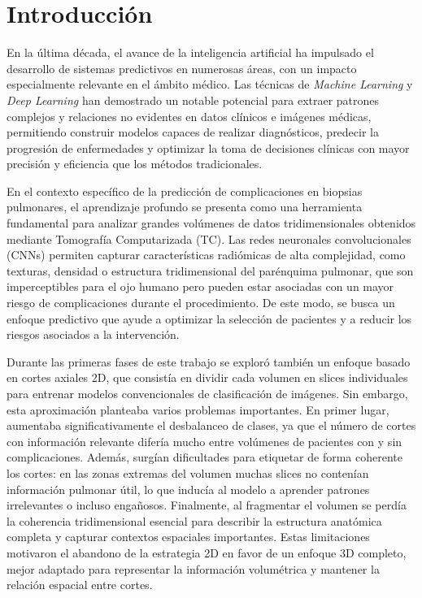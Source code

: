 
\chapter{Introducción}
En la última década, el avance de la inteligencia artificial ha impulsado el desarrollo de sistemas predictivos en numerosas áreas, con un impacto especialmente relevante en el ámbito médico. Las técnicas de \textit{Machine Learning} y \textit{Deep Learning} han demostrado un notable potencial para extraer patrones complejos y relaciones no evidentes en datos clínicos e imágenes médicas, permitiendo construir modelos capaces de realizar diagnósticos, predecir la progresión de enfermedades y optimizar la toma de decisiones clínicas con mayor precisión y eficiencia que los métodos tradicionales.

En el contexto específico de la predicción de complicaciones en biopsias pulmonares, el aprendizaje profundo se presenta como una herramienta fundamental para analizar grandes volúmenes de datos tridimensionales obtenidos mediante Tomografía Computarizada (TC). Las redes neuronales convolucionales (CNNs) permiten capturar características radiómicas de alta complejidad, como texturas, densidad o estructura tridimensional del parénquima pulmonar, que son imperceptibles para el ojo humano pero pueden estar asociadas con un mayor riesgo de complicaciones durante el procedimiento. De este modo, se busca un enfoque predictivo que ayude a optimizar la selección de pacientes y a reducir los riesgos asociados a la intervención.

Durante las primeras fases de este trabajo se exploró también un enfoque basado en cortes axiales 2D, que consistía en dividir cada volumen en slices individuales para entrenar modelos convencionales de clasificación de imágenes. Sin embargo, esta aproximación planteaba varios problemas importantes. En primer lugar, aumentaba significativamente el desbalanceo de clases, ya que el número de cortes con información relevante difería mucho entre volúmenes de pacientes con y sin complicaciones. Además, surgían dificultades para etiquetar de forma coherente los cortes: en las zonas extremas del volumen muchas slices no contenían información pulmonar útil, lo que inducía al modelo a aprender patrones irrelevantes o incluso engañosos. Finalmente, al fragmentar el volumen se perdía la coherencia tridimensional esencial para describir la estructura anatómica completa y capturar contextos espaciales importantes. Estas limitaciones motivaron el abandono de la estrategia 2D en favor de un enfoque 3D completo, mejor adaptado para representar la información volumétrica y mantener la relación espacial entre cortes.

